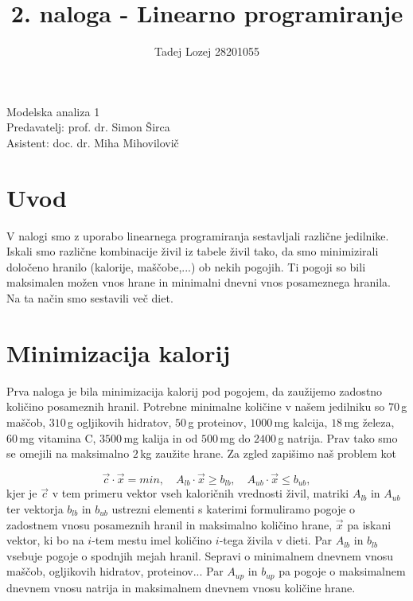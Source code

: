 \documentclass[slovene,11pt,a4paper]{article}
\begin{document}
\title{2. naloga - Linearno programiranje}
\author{Tadej Lozej 28201055}
\maketitle
\begin{center}
Modelska analiza 1 \\
\bigskip
Predavatelj: prof. dr. Simon Širca \\
Asistent: doc. dr. Miha Mihovilovič
\end{center}

\newpage

\tableofcontents

\newpage

\section{Uvod}


V nalogi smo z uporabo linearnega programiranja sestavljali različne jedilnike. Iskali smo različne kombinacije živil iz tabele živil tako, da smo minimizirali določeno hranilo (kalorije, maščobe,...) ob nekih pogojih. Ti pogoji so bili maksimalen možen vnos hrane in minimalni dnevni vnos posameznega hranila. Na ta način smo sestavili več diet.

\section{Minimizacija kalorij}

Prva naloga je bila minimizacija kalorij pod pogojem, da zaužijemo zadostno količino posameznih hranil. Potrebne minimalne količine v našem jedilniku so $70\,$g maščob, $310\,$g ogljikovih hidratov, $50\,$g proteinov, $1000\,$mg kalcija, $18\,$mg železa, $60\,$mg vitamina C, $3500\,$mg kalija in od $500\,$mg do $2400\,$g natrija. Prav tako smo se omejili na maksimalno $2\,$kg zaužite hrane. Za zgled zapišimo naš problem kot

\[
\vec{c}\cdot \vec{x} = min, \quad A_{lb} \cdot \vec{x} \geq b_{lb}, \quad A_{ub} \cdot \vec{x} \leq b_{ub},
\]
kjer je $\vec{c}$ v tem primeru vektor vseh kaloričnih vrednosti živil, matriki $A_{lb}$ in $A_{ub}$ ter vektorja $b_{lb}$ in $b_{ub}$ ustrezni elementi s katerimi formuliramo pogoje o zadostnem vnosu posameznih hranil in maksimalno količino hrane, $\vec{x}$ pa iskani vektor, ki bo na $i$-tem mestu imel količino $i$-tega živila v dieti. Par $A_{lb}$ in $b_{lb}$ vsebuje pogoje o spodnjih mejah hranil. Sepravi o minimalnem dnevnem vnosu maščob, ogljikovih hidratov, proteinov... Par $A_{up}$ in $b_{up}$ pa pogoje o maksimalnem dnevnem vnosu natrija in maksimalnem dnevnem vnosu količine hrane.
\end{document}
